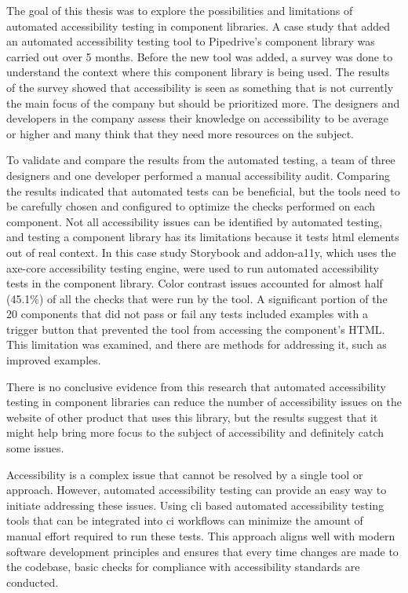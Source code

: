 \documentclass{master_thesis}
\begin{document}
The goal of this thesis was to explore the possibilities and limitations of automated accessibility testing in component libraries. A case study that added an automated accessibility testing tool to Pipedrive's component library was carried out over 5 months.  Before the new tool was added, a survey was done to understand the context where this component library is being used. The results of the survey showed that accessibility is seen as something that is not currently the main focus of the company but should be prioritized more. The designers and developers in the company assess their knowledge on accessibility to be average or higher and many think that they need more resources on the subject.

To validate and compare the results from the automated testing, a team of three designers and one developer performed a manual accessibility audit. Comparing the results indicated that automated tests can be beneficial, but the tools need to be carefully chosen and configured to optimize the checks performed on each component. Not all accessibility issues can be identified by automated testing, and testing a component library has its limitations because it tests \ac{html} elements out of real context. In this case study Storybook and addon-a11y, which uses the axe-core accessibility testing engine, were used to run automated accessibility tests in the component library. Color contrast issues accounted for almost half (45.1\%) of all the checks that were run by the tool. A significant portion of the 20 components that did not pass or fail any tests included examples with a trigger button that prevented the tool from accessing the component's HTML. This limitation was examined, and there are methods for addressing it, such as improved examples.

There is no conclusive evidence from this research that automated accessibility testing in component libraries can reduce the number of accessibility issues on the website of other product that uses this library, but the results suggest that it might help bring more focus to the subject of accessibility and definitely catch some issues.

Accessibility is a complex issue that cannot be resolved by a single tool or approach. However, automated accessibility testing can provide an easy way to initiate addressing these issues. Using \ac{cli} based automated accessibility testing tools that can be integrated into \ac{ci} workflows can minimize the amount of manual effort required to run these tests. This approach aligns well with modern software development principles and ensures that every time changes are made to the codebase, basic checks for compliance with accessibility standards are conducted.
\end{document}
